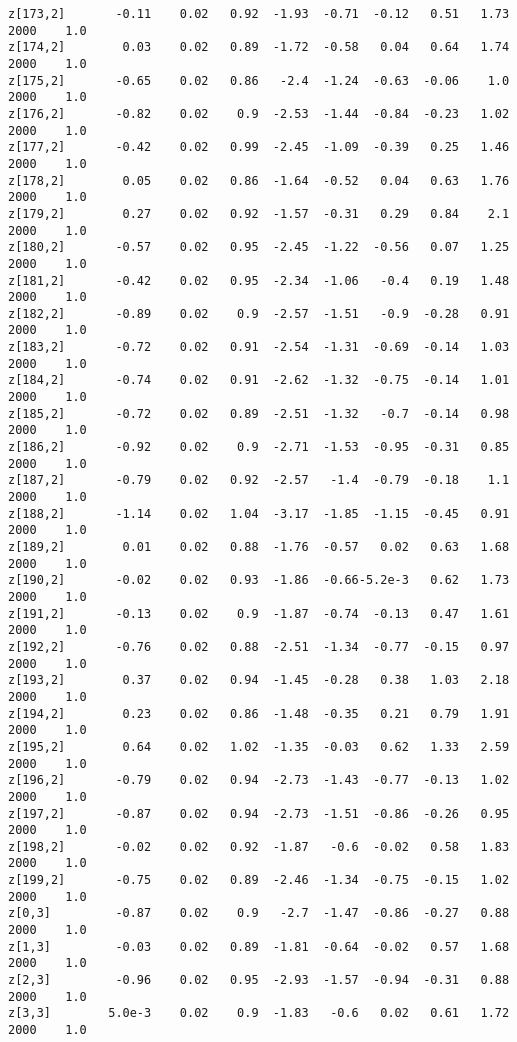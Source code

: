 \documentclass[11pt]{article}
\begin{document}
\begin{Verbatim}[commandchars=\\\{\}]
z[173,2]       -0.11    0.02   0.92  -1.93  -0.71  -0.12   0.51   1.73   2000    1.0
z[174,2]        0.03    0.02   0.89  -1.72  -0.58   0.04   0.64   1.74   2000    1.0
z[175,2]       -0.65    0.02   0.86   -2.4  -1.24  -0.63  -0.06    1.0   2000    1.0
z[176,2]       -0.82    0.02    0.9  -2.53  -1.44  -0.84  -0.23   1.02   2000    1.0
z[177,2]       -0.42    0.02   0.99  -2.45  -1.09  -0.39   0.25   1.46   2000    1.0
z[178,2]        0.05    0.02   0.86  -1.64  -0.52   0.04   0.63   1.76   2000    1.0
z[179,2]        0.27    0.02   0.92  -1.57  -0.31   0.29   0.84    2.1   2000    1.0
z[180,2]       -0.57    0.02   0.95  -2.45  -1.22  -0.56   0.07   1.25   2000    1.0
z[181,2]       -0.42    0.02   0.95  -2.34  -1.06   -0.4   0.19   1.48   2000    1.0
z[182,2]       -0.89    0.02    0.9  -2.57  -1.51   -0.9  -0.28   0.91   2000    1.0
z[183,2]       -0.72    0.02   0.91  -2.54  -1.31  -0.69  -0.14   1.03   2000    1.0
z[184,2]       -0.74    0.02   0.91  -2.62  -1.32  -0.75  -0.14   1.01   2000    1.0
z[185,2]       -0.72    0.02   0.89  -2.51  -1.32   -0.7  -0.14   0.98   2000    1.0
z[186,2]       -0.92    0.02    0.9  -2.71  -1.53  -0.95  -0.31   0.85   2000    1.0
z[187,2]       -0.79    0.02   0.92  -2.57   -1.4  -0.79  -0.18    1.1   2000    1.0
z[188,2]       -1.14    0.02   1.04  -3.17  -1.85  -1.15  -0.45   0.91   2000    1.0
z[189,2]        0.01    0.02   0.88  -1.76  -0.57   0.02   0.63   1.68   2000    1.0
z[190,2]       -0.02    0.02   0.93  -1.86  -0.66-5.2e-3   0.62   1.73   2000    1.0
z[191,2]       -0.13    0.02    0.9  -1.87  -0.74  -0.13   0.47   1.61   2000    1.0
z[192,2]       -0.76    0.02   0.88  -2.51  -1.34  -0.77  -0.15   0.97   2000    1.0
z[193,2]        0.37    0.02   0.94  -1.45  -0.28   0.38   1.03   2.18   2000    1.0
z[194,2]        0.23    0.02   0.86  -1.48  -0.35   0.21   0.79   1.91   2000    1.0
z[195,2]        0.64    0.02   1.02  -1.35  -0.03   0.62   1.33   2.59   2000    1.0
z[196,2]       -0.79    0.02   0.94  -2.73  -1.43  -0.77  -0.13   1.02   2000    1.0
z[197,2]       -0.87    0.02   0.94  -2.73  -1.51  -0.86  -0.26   0.95   2000    1.0
z[198,2]       -0.02    0.02   0.92  -1.87   -0.6  -0.02   0.58   1.83   2000    1.0
z[199,2]       -0.75    0.02   0.89  -2.46  -1.34  -0.75  -0.15   1.02   2000    1.0
z[0,3]         -0.87    0.02    0.9   -2.7  -1.47  -0.86  -0.27   0.88   2000    1.0
z[1,3]         -0.03    0.02   0.89  -1.81  -0.64  -0.02   0.57   1.68   2000    1.0
z[2,3]         -0.96    0.02   0.95  -2.93  -1.57  -0.94  -0.31   0.88   2000    1.0
z[3,3]        5.0e-3    0.02    0.9  -1.83   -0.6   0.02   0.61   1.72   2000    1.0

\end{Verbatim}
\end{document}
